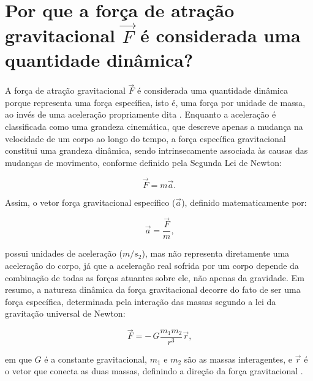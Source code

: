 \section{Por que a força de atração gravitacional $\vec{F}$ é considerada uma quantidade dinâmica?}


A força de atração gravitacional \(\vec{F}\) é considerada uma quantidade dinâmica porque representa uma força específica, isto é, uma força por unidade de massa, ao invés de uma aceleração propriamente dita \citep{sneeuw2006physical}. Enquanto a aceleração é classificada como uma grandeza cinemática, que descreve apenas a mudança na velocidade de um corpo ao longo do tempo, a força específica gravitacional constitui uma grandeza dinâmica, sendo intrinsecamente associada às causas das mudanças de movimento, conforme definido pela Segunda Lei de Newton:

\begin{equation*}
  \label{eq_dinamica}
  \vec{F} = m \vec{a} \text{.}  
\end{equation*}

\noindent
Assim, o vetor força gravitacional específico (\(\vec{a}\)), definido matematicamente por:

\begin{equation*}
  \label{eq_específico}
  \vec{a} = \frac{\vec{F}}{m} \text{,}  
\end{equation*}

\noindent
possui unidades de aceleração (\(m/s_2\)), mas não representa diretamente uma aceleração do corpo, já que a aceleração real sofrida por um corpo depende da combinação de todas as forças atuantes sobre ele, não apenas da gravidade. Em resumo, a natureza dinâmica da força gravitacional decorre do fato de ser uma força específica, determinada pela interação das massas segundo a lei da gravitação universal de Newton:


\begin{equation*}
  \label{eq_gravitação}
  \vec{F} = -\,G \frac{m_1 m_2}{r^3} \vec{r} \text{,}  
\end{equation*}

\noindent
em que \(G\) é a constante gravitacional, \(m_1\) e \(m_2\) são as massas interagentes, e \(\vec{r}\) é o vetor que conecta as duas massas, definindo a direção da força gravitacional \citep{sneeuw2006physical}.
